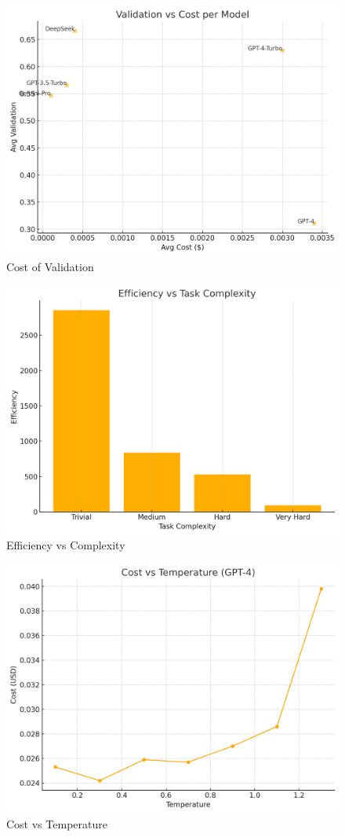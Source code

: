 \documentclass{article}
\begin{document}
  \begin{figure}[h!]
    \centering
    \includegraphics[width=0.75\linewidth]{validation_vs_cost.png}
    \caption{Cost of Validation}
    \label{fig:validation_vs_cost}
  \end{figure}

  \begin{figure}[h!]
    \centering
    \includegraphics[width=0.75\linewidth]{efficiency_vs_complexity.png}
    \caption{Efficiency vs Complexity}
    \label{fig:efficiency_vs_complexity}
  \end{figure}

  \begin{figure}[h!]
    \centering
    \includegraphics[width=0.75\linewidth]{cost_vs_temperature.png}
    \caption{Cost vs Temperature}
    \label{fig:cost_vs_temperature}
  \end{figure}
\end{document}
